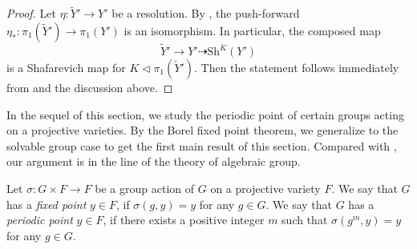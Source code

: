 \begin{proof}
	Let $\eta:\widetilde{Y}'\rightarrow Y'$ be a resolution. By \cite[Theorem 1.1]{Tak03}, the push-forward $\eta_*:\pi_1(\widetilde{Y}')\rightarrow \pi_1(Y')$ is an isomorphism. In particular, the composed map 
	\[
	\widetilde{Y}' \rightarrow Y' \dashrightarrow \text{Sh}^K(Y')
	\]
	is a Shafarevich map for $K\lhd \pi_1(\widetilde{Y}')$. Then the statement follows immediately from \cite[Th\'eor\`eme 1]{CCE15} and the discussion above.
\end{proof}


In the sequel of this section, we study the periodic point of certain groups acting on a projective varieties. By the Borel fixed point theorem, we generalize \cite[Theorem 4.1]{LOY19} to the solvable group case to get the first main result of this section.
Compared with \cite[Theorem 4.1]{LOY19}, our argument is in the line of the theory of algebraic group.


Let $\sigma:G\times F\to F$ be a group action of $G$ on a projective variety $F$.
We say that $G$ has a \textit{fixed point} $y\in F$, if  $\sigma(g,y)=y$ for any $g\in G$.
We say that $G$ has a \textit{periodic point} $y\in F$, if there exists a positive integer $m$ such that $\sigma(g^m,y)=y$ for any $g\in G$. 

